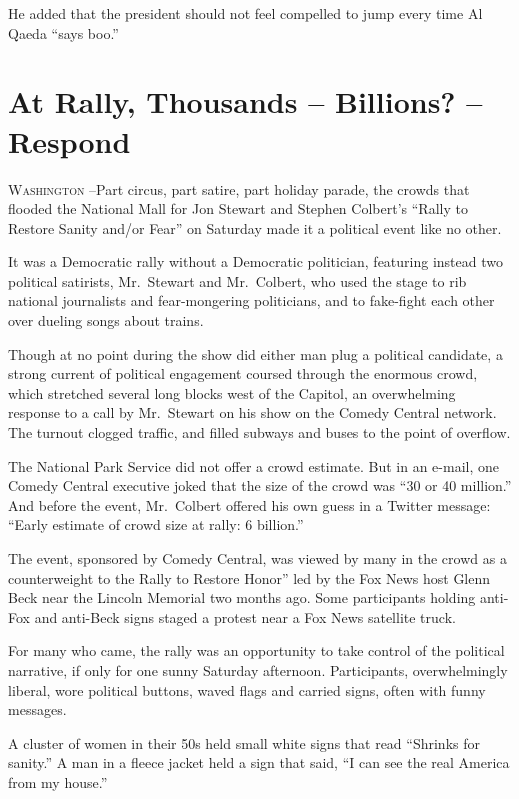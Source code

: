 ﻿\documentclass[12pt]{article}
\begin{document}
He added that the president should not feel compelled to jump every time Al Qaeda ``says boo.''

\section{At Rally, Thousands -- Billions? -- Respond}

\lettrine{W}{ashington} --Part circus, part satire, part holiday parade, the
crowds that flooded the National Mall for Jon Stewart and Stephen Colbert's ``Rally to Restore
Sanity and/or Fear'' on Saturday made it a political event like no other.

It was a Democratic rally without a Democratic politician, featuring instead two political
satirists, Mr.~Stewart and Mr.~Colbert, who used the stage to rib national journalists and
fear-mongering politicians, and to fake-fight each other over dueling songs about trains.

Though at no point during the show did either man plug a political candidate, a strong current of
political engagement coursed through the enormous crowd, which stretched several long blocks west of
the Capitol, an overwhelming response to a call by Mr.~Stewart on his show on the Comedy Central
network. The turnout clogged traffic, and filled subways and buses to the point of overflow.

The National Park Service did not offer a crowd estimate. But in an e-mail, one Comedy Central
executive joked that the size of the crowd was ``30 or 40 million.'' And before the event,
Mr.~Colbert offered his own guess in a Twitter message: ``Early estimate of crowd size at rally: 6
billion.''

The event, sponsored by Comedy Central, was viewed by many in the crowd as a counterweight to the
Rally to Restore Honor'' led by the Fox News host Glenn Beck near the Lincoln Memorial two months
ago. Some participants holding anti-Fox and anti-Beck signs staged a protest near a Fox News
satellite truck.

For many who came, the rally was an opportunity to take control of the political narrative, if only
for one sunny Saturday afternoon. Participants, overwhelmingly liberal, wore political buttons,
waved flags and carried signs, often with funny messages.

A cluster of women in their 50s held small white signs that read ``Shrinks for sanity.'' A man in a
fleece jacket held a sign that said, ``I can see the real America from my house.''
\end{document}

